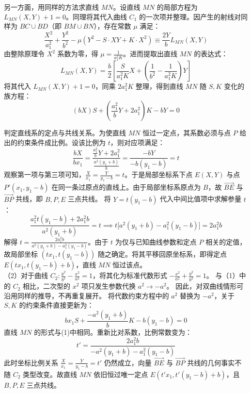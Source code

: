 \begin{solution}
另一方面，用同样的方法求直线 $MN$。设直线 $MN$ 的局部方程为 $L_{MN}(X,Y) + 1 = 0$。同理将其代入曲线 $C_1$ 的一次项并整理。因产生的射线对同样为 $BC \cup BD$（即 $BM \cup BN$），存在常数 $\mu$ 满足：
$$ \frac{X^2}{a_1^2} + \frac{Y^2}{b^2} - \mu (Y^2 - S \cdot XY + K \cdot X^2) \equiv \frac{2Y}{b} L_{MN}(X,Y) $$
由整除原理令 $X^2$ 系数为零，得 $\mu = \frac{1}{a_1^2 K}$。进而提取出直线 $MN$ 的表达式：
$$ L_{MN}(X,Y) = \frac{b}{2} \left[ \frac{S}{a_1^2 K} X + \left(\frac{1}{b^2} - \frac{1}{a_1^2 K}\right)Y \right] $$
将其代入 $L_{MN}(X,Y) + 1 = 0$，同乘 $2a_1^2 K$ 整理，得到直线 $MN$ 随 $S, K$ 变化的族方程：
$$ (b X) S + \left( \frac{a_1^2}{b} Y + 2a_1^2 \right) K - b Y = 0 $$

判定直线系的定点与共线关系。为使直线 $MN$ 恒过一定点，其系数必须与点 $P$ 给出的约束条件成比例。设该比例为 $t$，则对应项满足：
$$ \frac{b X}{b x_1} = \frac{\frac{a_1^2}{b} Y + 2a_1^2}{\frac{a^2(y_1+b)}{b}} = \frac{-b Y}{-b(y_1-b)} = t $$
观察第一项与第三项可知，$\frac{X}{x_1} = \frac{Y}{y_1-b} = t$。于是局部坐标系下点 $E(X,Y)$ 与点 $P'(x_1, y_1-b)$ 在同一条过原点的直线上。由于局部坐标系原点为 $B$，故 $\overrightarrow{BE}$ 与 $\overrightarrow{BP}$ 共线，即 $B, P, E$ 三点共线。
将 $Y = t(y_1-b)$ 代入中间比值项中求解参量 $t$：
$$ \frac{a_1^2 t(y_1-b) + 2a_1^2 b}{a^2(y_1+b)} = t \implies t \big[ a^2(y_1+b) - a_1^2(y_1-b) \big] = 2a_1^2 b $$
解得 $t = \frac{2a_1^2 b}{a^2(y_1+b) - a_1^2(y_1-b)}$。由于 $t$ 为仅与已知曲线参数和定点 $P$ 相关的定值，故局部坐标 $(tx_1, t(y_1-b))$ 随之确定。将其平移回原坐标系，即得定点 $E(tx_1, t(y_1-b)+b)$，直线 $MN$ 恒过该点。\\
（2）对于曲线 $C_2: \frac{y^2}{b^2} - \frac{x^2}{a^2} = 1$，将其化为标准代数形式 $-\frac{x^2}{a^2} + \frac{y^2}{b^2} = 1$。
与（1）中的 $C_2$ 相比，二次型的 $x^2$ 项只发生参数代换 $a^2 \to -a^2$。
因此，对双曲线情形可沿用同样的推导，不再重复展开。
将代数约束方程中的 $a^2$ 替换为 $-a^2$，关于 $S, K$ 的约束条件直接更新为：
$$ b x_1 S + \frac{-a^2(y_1+b)}{b} K - b(y_1-b) = 0 $$
直线 $MN$ 的形式与(1)中相同。重新比对系数，比例常数变为：
$$ t' = \frac{2a_1^2 b}{-a^2(y_1+b) - a_1^2(y_1-b)} $$
此时坐标比例关系 $\frac{X}{x_1} = \frac{Y}{y_1-b} = t'$ 仍然成立，向量 $\overrightarrow{BE}$ 与 $\overrightarrow{BP}$ 共线的几何事实不随 $C_2$ 类型改变。故直线 $MN$ 依旧恒过唯一定点 $E(t'x_1, t'(y_1-b)+b)$，且 $B, P, E$ 三点共线。
\end{solution}


